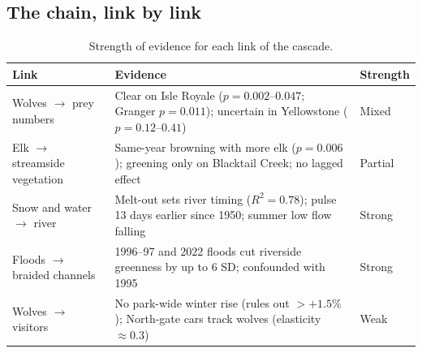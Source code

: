 \documentclass[11pt,a4paper]{article}
\begin{document}
\subsection{The chain, link by link}
\begin{table}[H]
\centering\small
\caption{Strength of evidence for each link of the cascade.}\label{tab:chain}
\begin{tabularx}{\textwidth}{@{}l Y l@{}}
\toprule
Link & Evidence & Strength \\
\midrule
Wolves $\rightarrow$ prey numbers & Clear on Isle Royale ($p=0.002$--$0.047$; Granger $p=0.011$); uncertain in Yellowstone ($p=0.12$--$0.41$) & Mixed \\
Elk $\rightarrow$ streamside vegetation & Same-year browning with more elk ($p=0.006$); greening only on Blacktail Creek; no lagged effect & Partial \\
Snow and water $\rightarrow$ river & Melt-out sets river timing ($R^2=0.78$); pulse 13 days earlier since 1950; summer low flow falling & Strong \\
Floods $\rightarrow$ braided channels & 1996--97 and 2022 floods cut riverside greenness by up to 6 SD; confounded with 1995 & Strong \\
Wolves $\rightarrow$ visitors & No park-wide winter rise (rules out $>+1.5\%$); North-gate cars track wolves (elasticity $\approx0.3$) & Weak \\
\bottomrule
\end{tabularx}
\end{table}

\end{document}
